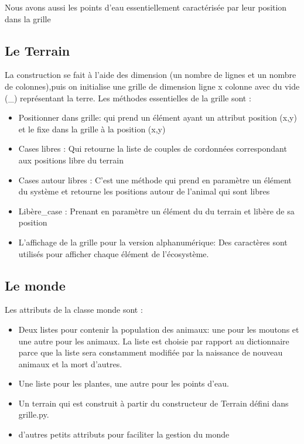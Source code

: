 \documentclass[a4paper,12pt]{article} %
\begin{document}
Nous avons aussi les points d'eau essentiellement caractérisée par leur position dans la grille

\subsection{Le Terrain}
    La construction se fait à l'aide des dimension (un nombre de lignes et un nombre de colonnes),puis on initialise une grille de dimension ligne x colonne avec du vide (\_) représentant la terre. Les méthodes essentielles de la grille sont :
    \begin{itemize}
        \item Positionner dans grille: qui prend un élément ayant un attribut position (x,y) et le fixe dans la grille à la position (x,y)
        \item Cases libres : Qui retourne la liste de couples de cordonnées correspondant aux positions libre du terrain
        \item Cases autour libres : C'est une méthode qui prend en paramètre un élément du système et retourne les positions autour de l'animal qui sont libres
        \item Libère\_case : Prenant en paramètre un élément du du terrain et libère de sa position
        \item L'affichage de la grille pour la version alphanumérique: Des caractères sont utilisés pour afficher chaque élément de l'écosystème.
    \end{itemize}


\subsection{Le monde}
Les attributs de la classe monde sont :
\begin{itemize}
    \item Deux listes pour contenir la population des animaux: une pour les moutons et une autre pour les animaux. La liste est choisie par rapport au dictionnaire parce que la liste sera constamment modifiée par la naissance de nouveau animaux et la mort d'autres.
    \item Une liste pour les plantes, une autre pour les points d'eau.
    \item Un terrain qui est construit à partir du constructeur de Terrain défini dans grille.py.
    \item d'autres petits attributs pour faciliter la gestion du monde
\end{itemize}
\end{document}

